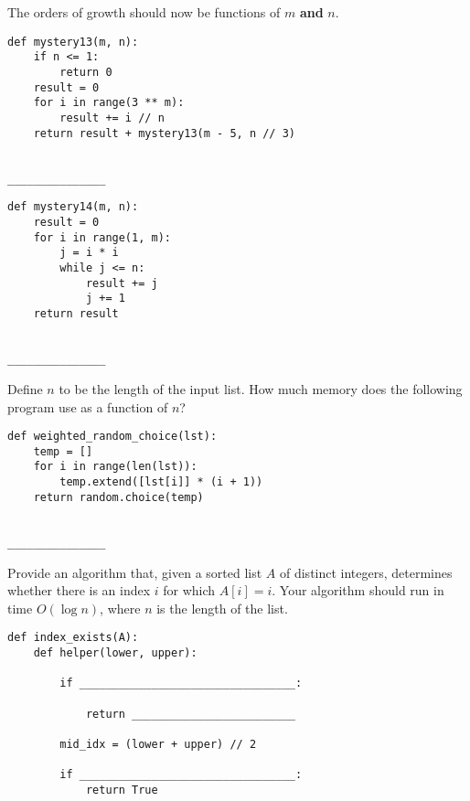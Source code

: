 \documentclass[twoside]{article}
\begin{document}
\begin{enumerate}

The orders of growth should now be functions of $m$ \textbf{and} $n$.

\begin{lstlisting}
def mystery13(m, n):
    if n <= 1:
        return 0
    result = 0
    for i in range(3 ** m):
        result += i // n
    return result + mystery13(m - 5, n // 3)
\end{lstlisting}
~\\
\lstinline{_______________}

\begin{lstlisting}
def mystery14(m, n):
    result = 0
    for i in range(1, m):
        j = i * i
        while j <= n:
            result += j
            j += 1
    return result
\end{lstlisting}
~\\
\lstinline{_______________}

\newpage


Define $n$ to be the length of the input list. How much memory does the following program use as a function of $n$?

\begin{lstlisting}
def weighted_random_choice(lst):
    temp = []
    for i in range(len(lst)):
        temp.extend([lst[i]] * (i + 1))
    return random.choice(temp)
\end{lstlisting}
~\\
\lstinline{_______________}


Provide an algorithm that, given a sorted list $A$ of distinct integers, determines whether there is an index $i$ for which $A[i] = i$. Your algorithm should run in time $O(\log{n})$, where $n$ is the length of the list.

\begin{lstlisting}
def index_exists(A):
    def helper(lower, upper):
    
        if _________________________________:
        
            return _________________________
            
        mid_idx = (lower + upper) // 2
        
        if _________________________________:
            return True
            

\end{lstlisting}
\end{enumerate}
\end{document}
